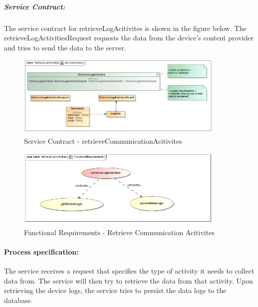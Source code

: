 \documentclass[hidelinks, 12pt, oneside]{article}
\begin{document}
		\subparagraph{Service Contract:}
		The service contract for retrieveLogAcitivites is shown in the figure below. The retrieveLogActivitiesRequest requests the data from the device's content provider and tries to send the data to the server.
		
		\begin{figure}[!htbp]
    		\centering
    		\includegraphics[width=0.9\textwidth]{img/serviceContractRetrieveCommunicationActivities.jpg}
    		\caption{Service Contract - retrieveCommunicationAcitivites}
    		\label{fig:ServiceCon_retrieveCommunicationAcitivites}
		\end{figure}
				

		\begin{figure}[!htbp]
    		\centering
    		\includegraphics[width=0.9\textwidth]{img/functionalRequirementsRetrieveCommunicationActivities.jpg}
    		\caption{Functional Requirements - Retrieve Communication Acitivites}
    		\label{fig:FunctionalReq_retrieveCommunicationAcitivites}
		\end{figure}	
		
		
			\newpage
			\paragraph{Process specification:}
			The  service receives a request that specifies the type of activity it needs to collect data from. The service will then try to retrieve the data from that activity. Upon retrieving the device logs, the service tries to persist the data logs to the database.
			
\end{document}

